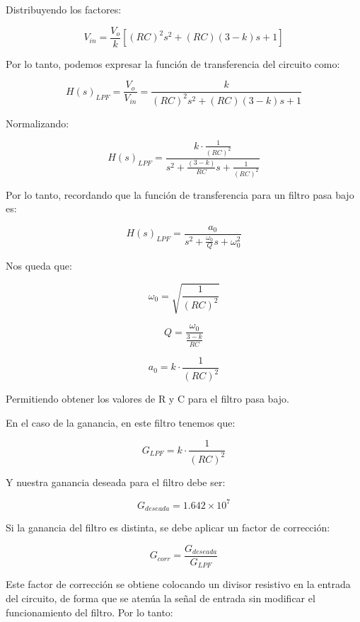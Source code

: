 \documentclass[12pt,a4paper]{article}
\begin{document}
Distribuyendo los factores:

\[
V_{in} = \frac{V_o}{k}
\left[
(RC)^2 s^2 + (RC)(3 - k)s + 1
\right]
\]

Por lo tanto, podemos expresar la función de transferencia del circuito como:

\[
H(s)_{LPF} = \frac{V_o}{V_{in}} =
\frac{k}{(RC)^2 s^2 + (RC)(3 - k)s + 1}
\]

Normalizando:

\[
H(s)_{LPF} =
\frac{k \cdot \frac{1}{(RC)^2}}
{s^2 + \frac{(3 - k)}{RC}s + \frac{1}{(RC)^2}}
\]

Por lo tanto, recordando que la función de transferencia para un filtro pasa bajo es:

\[
H(s)_{LPF} =
\frac{a_0}{s^2 + \frac{\omega_0}{Q}s + \omega_0^2}
\]

Nos queda que:

\begin{equation}
\omega_0 = \sqrt{\frac{1}{(RC)^2}}
\end{equation}

\begin{equation}
Q = \frac{\omega_0}{\frac{3 - k}{RC}}
\end{equation}

\begin{equation}
a_0 = k \cdot \frac{1}{(RC)^2}
\end{equation}
\newline

Permitiendo obtener los valores de R y C para el filtro pasa bajo.

En el caso de la ganancia, en este filtro tenemos que:

\begin{equation}
G_{LPF} = k \cdot \frac{1}{(RC)^2}
\end{equation}

Y nuestra ganancia deseada para el filtro debe ser:

\begin{equation}
G_{deseada} = 1.642 \times 10^7
\end{equation}

Si la ganancia del filtro es distinta, se debe aplicar un factor de corrección:

\begin{equation}
G_{corr} = \frac{G_{deseada}}{G_{LPF}}
\end{equation}

Este factor de corrección se obtiene colocando un divisor resistivo en la entrada del circuito, de forma que se atenúa la señal de entrada sin modificar el funcionamiento del filtro. Por lo tanto:
\end{document}
